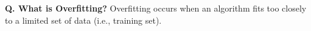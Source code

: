 \begin{frame}[fragile]{\textbf{Q. What is Overfitting?}}
  Overfitting occurs when an algorithm
  fits too closely to a limited set of data (i.e., training set).
  \begin{columns}[T]
  \begin{column}{.58\textwidth}
\end{column}
\end{columns}
\end{frame}
